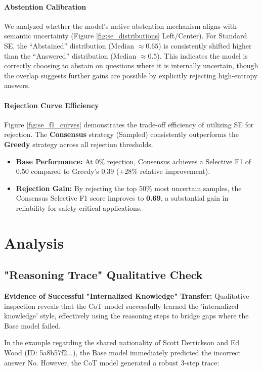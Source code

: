 \documentclass{article}
\begin{document}
\paragraph{Abstention Calibration}
We analyzed whether the model's native abstention mechanism aligns with semantic uncertainty (Figure \ref{fig:se_distributions} Left/Center). For Standard SE, the ``Abstained'' distribution (Median $\approx 0.65$) is consistently shifted higher than the ``Answered'' distribution (Median $\approx 0.5$). This indicates the model is correctly choosing to abstain on questions where it is internally uncertain, though the overlap suggests further gains are possible by explicitly rejecting high-entropy answers.

\paragraph{Rejection Curve Efficiency}
Figure \ref{fig:se_f1_curves} demonstrates the trade-off efficiency of utilizing SE for rejection. The \textbf{Consensus} strategy (Sampled) consistently outperforms the \textbf{Greedy} strategy across all rejection thresholds. 
\begin{itemize}
    \item \textbf{Base Performance:} At 0\% rejection, Consensus achieves a Selective F1 of 0.50 compared to Greedy's 0.39 (+28\% relative improvement).
    \item \textbf{Rejection Gain:} By rejecting the top 50\% most uncertain samples, the Consensus Selective F1 score improves to \textbf{0.69}, a substantial gain in reliability for safety-critical applications.
\end{itemize}

\section{Analysis}

\subsection{"Reasoning Trace" Qualitative Check}
\textbf{Evidence of Successful "Internalized Knowledge" Transfer:} Qualitative inspection reveals that the CoT model successfully learned the 'internalized knowledge' style, effectively using the reasoning steps to bridge gaps where the Base model failed.

In the example regarding the shared nationality of Scott Derrickson and Ed Wood (ID: 5a8b57f2...), the Base model immediately predicted the incorrect answer No. However, the CoT model generated a robust 3-step trace:
\end{document}
